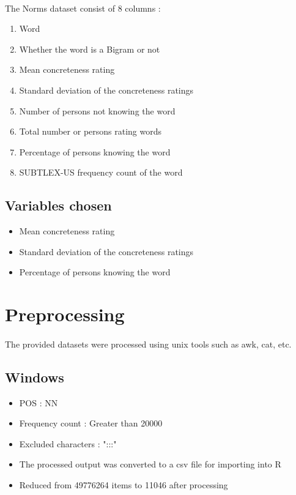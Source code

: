 \documentclass[11pt,a4paper]{article}
\begin{document}
\paragraph{}
The Norms dataset consist of 8 columns :
\begin{enumerate}
	\item Word
	\item Whether the word is a Bigram or not
	\item Mean concreteness rating
	\item Standard deviation of the concreteness ratings
	\item Number of persons not knowing the word
	\item Total number or persons rating words
	\item Percentage of persons knowing the word
	\item SUBTLEX-US frequency count of the word \cite{brysbaert_new_2009}
\end{enumerate}

\subsection{Variables chosen}

\begin{itemize}
	\item Mean concreteness rating
	\item Standard deviation of the concreteness ratings
	\item Percentage of persons knowing the word
\end{itemize}


\section{Preprocessing}
\paragraph{}
The provided datasets were processed using unix tools such as awk, cat, etc.

\subsection{Windows}
\begin{itemize}
	\item POS : NN
	\item Frequency count : Greater than 20000
	\item Excluded characters : ":::"
	\item The processed output was converted to a csv file for importing into R
	\item Reduced from 49776264 items to 11046 after processing
\end{itemize}
\end{document}
